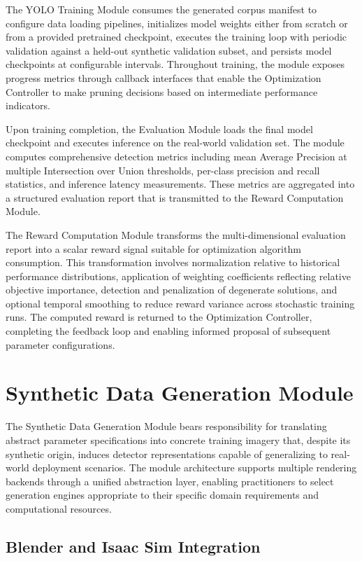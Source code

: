 The YOLO Training Module consumes the generated corpus manifest to configure data loading pipelines, initializes model weights either from scratch or from a provided pretrained checkpoint, executes the training loop with periodic validation against a held-out synthetic validation subset, and persists model checkpoints at configurable intervals. Throughout training, the module exposes progress metrics through callback interfaces that enable the Optimization Controller to make pruning decisions based on intermediate performance indicators.

Upon training completion, the Evaluation Module loads the final model checkpoint and executes inference on the real-world validation set. The module computes comprehensive detection metrics including mean Average Precision at multiple Intersection over Union thresholds, per-class precision and recall statistics, and inference latency measurements. These metrics are aggregated into a structured evaluation report that is transmitted to the Reward Computation Module.

The Reward Computation Module transforms the multi-dimensional evaluation report into a scalar reward signal suitable for optimization algorithm consumption. This transformation involves normalization relative to historical performance distributions, application of weighting coefficients reflecting relative objective importance, detection and penalization of degenerate solutions, and optional temporal smoothing to reduce reward variance across stochastic training runs. The computed reward is returned to the Optimization Controller, completing the feedback loop and enabling informed proposal of subsequent parameter configurations.

\section{Synthetic Data Generation Module}
\label{sec:synth_data_module}

The Synthetic Data Generation Module bears responsibility for translating abstract parameter specifications into concrete training imagery that, despite its synthetic origin, induces detector representations capable of generalizing to real-world deployment scenarios. The module architecture supports multiple rendering backends through a unified abstraction layer, enabling practitioners to select generation engines appropriate to their specific domain requirements and computational resources.

\subsection{Blender and Isaac Sim Integration}

